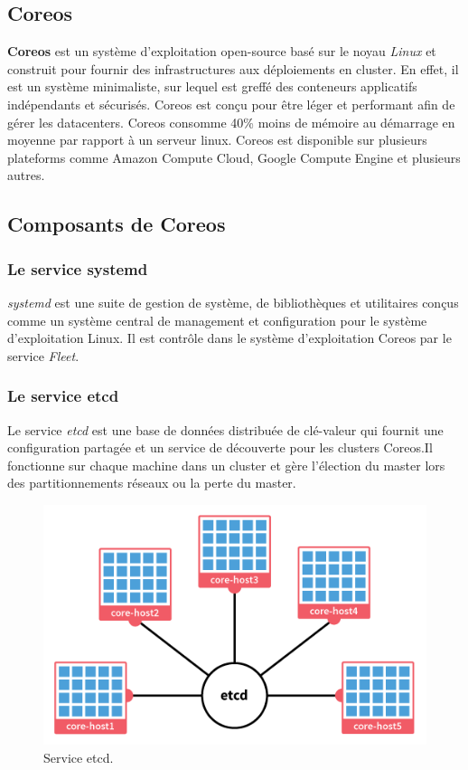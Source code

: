 \begin{onehalfspace}
\section{Coreos}
\textbf{Coreos} est un système d'exploitation open-source basé sur le noyau \emph{Linux} et construit pour fournir des infrastructures aux déploiements en cluster. En effet, il est un système minimaliste, sur lequel est greffé des conteneurs applicatifs indépendants et sécurisés. Coreos est conçu pour être léger et performant afin de gérer les datacenters. Coreos consomme 40\% moins de mémoire au démarrage en moyenne par rapport à un serveur linux. Coreos est disponible sur plusieurs plateforms comme Amazon Compute Cloud, Google Compute Engine et plusieurs autres.
\subsection{Composants de Coreos}
\subsubsection{Le service systemd}
\emph{systemd} est une suite de gestion de système, de bibliothèques et utilitaires conçus comme un système central de management et configuration pour le système d'exploitation Linux. Il est contrôle dans le système d'exploitation Coreos par le service \emph{Fleet}.
\subsubsection{Le service etcd}
Le service \emph{etcd} est une base de données distribuée de clé-valeur qui fournit une configuration partagée et un service de découverte pour les clusters Coreos.Il fonctionne sur chaque machine dans un cluster et gère l'élection du master lors des partitionnements réseaux ou la perte du master.
\begin{figure}[H]
\centering
\includegraphics [scale=0.4]{chapitre3/assets/etcd-cluster.png}
\caption{Service etcd.}
\end{figure}

\end{onehalfspace}
